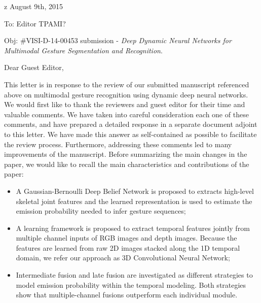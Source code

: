 \documentclass[12pt]{article}
\begin{document}
\begin{center}
\end{center}

\newcommand{\rev}[1]{{\noindent {\bf Comment:} {\it #1}}~\\}
\newcommand{\ans}[1]{{\noindent {\bf Response:} #1}~\\}


\begin{flushleft}z
August 9th, 2015
\end{flushleft}

\vspace*{3mm}

\begin{flushleft}
To: Editor TPAMI?
\end{flushleft}

\begin{flushleft}
Obj: \#VISI-D-14-00453 submission - {\em Deep Dynamic Neural Networks for Multimodal Gesture
Segmentation and Recognition}.
\end{flushleft}

\vspace*{3mm}

\pagestyle{empty}

\noindent Dear Guest Editor,
\newline

This letter is in response to the review of our submitted manuscript referenced above on
multimodal gesture recognition using dynamic deep neural networks.
%
We would first like to thank  the reviewers and guest editor for their time and valuable comments.
We have taken into careful consideration each one of these comments, and have prepared a detailed response
in a separate document adjoint to this letter.
We have made this answer as self-contained as possible to facilitate the review process.
%
Furthermore, addressing these comments led to many improvements of the manuscript.
%
Before summarizing the main changes in the paper, we would like to recall the main characteristics and
contributions of the paper:
\begin{itemize}
\item A Gaussian-Bernoulli Deep Belief Network is proposed to extracts high-level skeletal joint features and the learned representation is used to estimate the emission probability needed to infer gesture sequences;
\item A learning framework is proposed to extract temporal features jointly from multiple channel inputs of RGB images and depth images. Because the features are learned from raw 2D images stacked along the 1D temporal domain, we refer our approach as 3D Convolutional Neural Network;
\item Intermediate fusion and late fusion are investigated as different strategies to model emission probability within the temporal modeling. Both strategies show that multiple-channel fusions outperform each individual module.
\end{itemize}
\end{document}
